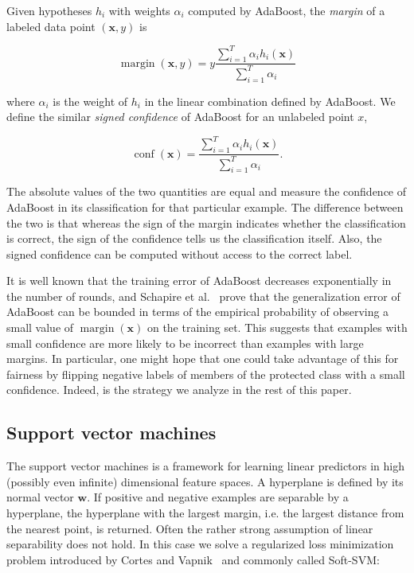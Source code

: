 \documentclass[conference]{IEEEtran}
\DeclareMathOperator{\margin}{margin}
\DeclareMathOperator{\conf}{conf}
\begin{document}
Given hypotheses $h_i$ with weights $\alpha_i$ computed by AdaBoost, the
\emph{margin} of a labeled data point $(\mathbf x,y)$ is

$$ \margin(\mathbf x,y) = y\frac{\sum_{i=1}^T \alpha_i h_i(\mathbf
x)}{\sum_{i=1}^T \alpha_i}$$

where $\alpha_i$ is the weight of $h_i$ in the linear combination defined by
AdaBoost.  We define the similar \emph{signed confidence} of AdaBoost for an
unlabeled point $x$,

$$ \conf(\mathbf x) = \frac{\sum_{i=1}^T \alpha_i h_i(\mathbf x)}{\sum_{i=1}^T \alpha_i}.$$

The absolute values of the two quantities are equal and measure the confidence
of AdaBoost in its classification for that particular example.  The difference
between the two is that whereas the sign of the margin indicates whether the
classification is correct, the sign of the confidence tells us the
classification itself. Also, the signed confidence can be computed without
access to the correct label.

It is well known that the training error of AdaBoost decreases exponentially in
the number of rounds, and Schapire et al.~\cite{SchapireFBL98} prove that the
generalization error of AdaBoost can be bounded in terms of the empirical
probability of observing a small value of $\margin(\mathbf x)$ on the training set.
This suggests that examples with small confidence are more likely to be
incorrect than examples with large margins. In particular, one might hope that
one could take advantage of this for fairness by flipping negative labels of
members of the protected class with a small confidence. Indeed, is the strategy
we analyze in the rest of this paper.

\subsection{Support vector machines}

The support vector machines is a framework for learning linear predictors in
high (possibly even infinite) dimensional feature spaces.  A hyperplane is
defined by its normal vector $\mathbf w$.  If positive and negative examples
are separable by a hyperplane, the hyperplane with the largest margin, i.e. the
largest distance from the nearest point, is returned.  Often the rather strong
assumption of linear separability does not hold.  In this case we solve a
regularized loss minimization problem introduced by Cortes and
Vapnik~\cite{CortesV95} and commonly called Soft-SVM:
\end{document}
